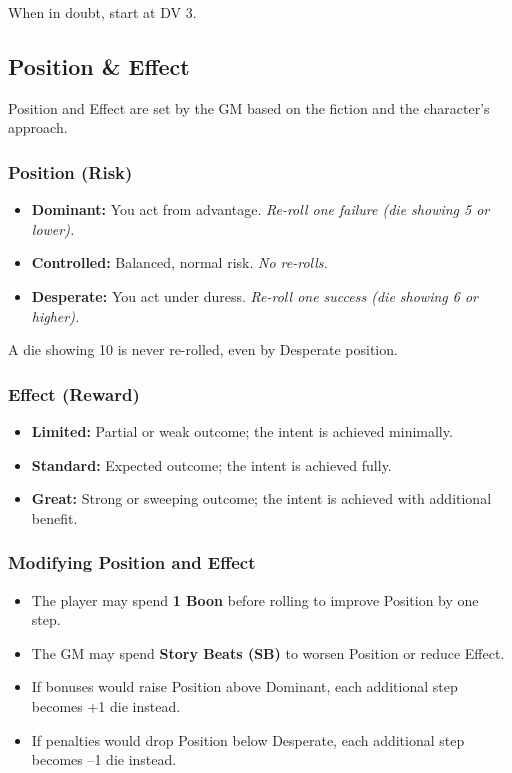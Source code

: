 When in doubt, start at DV 3.

\subsection{Position \& Effect}

Position and Effect are set by the GM based on the fiction and the character's approach.

\subsubsection{Position (Risk)}
\begin{itemize}
  \item \textbf{Dominant:} You act from advantage. \textit{Re-roll one failure (die showing 5 or lower).}
  \item \textbf{Controlled:} Balanced, normal risk. \textit{No re-rolls.}
  \item \textbf{Desperate:} You act under duress. \textit{Re-roll one success (die showing 6 or higher).}
\end{itemize}

A die showing 10 is never re-rolled, even by Desperate position.

\subsubsection{Effect (Reward)}
\begin{itemize}
  \item \textbf{Limited:} Partial or weak outcome; the intent is achieved minimally.
  \item \textbf{Standard:} Expected outcome; the intent is achieved fully.
  \item \textbf{Great:} Strong or sweeping outcome; the intent is achieved with additional benefit.
\end{itemize}

\subsubsection{Modifying Position and Effect}
\begin{itemize}
  \item The player may spend \textbf{1 Boon} before rolling to improve Position by one step.
  \item The GM may spend \textbf{Story Beats (SB)} to worsen Position or reduce Effect.
  \item If bonuses would raise Position above Dominant, each additional step becomes +1 die instead.
  \item If penalties would drop Position below Desperate, each additional step becomes –1 die instead.
\end{itemize}

